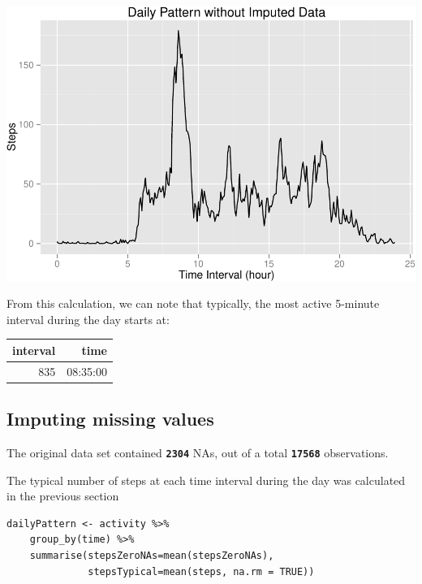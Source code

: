 \documentclass[]{article}
\newenvironment{Shaded}{\begin{snugshade}}{\end{snugshade}}
\newcommand{\KeywordTok}[1]{\textcolor[rgb]{0.13,0.29,0.53}{\textbf{{#1}}}}
\newcommand{\StringTok}[1]{\textcolor[rgb]{0.31,0.60,0.02}{{#1}}}
\newcommand{\CommentTok}[1]{\textcolor[rgb]{0.56,0.35,0.01}{\textit{{#1}}}}
\newcommand{\NormalTok}[1]{{#1}}
\begin{document}
\includegraphics{PA1_template_files/figure-latex/unnamed-chunk-2-1.pdf}

From this calculation, we can note that typically, the most active
5-minute interval during the day starts at:

\begin{Shaded}
\end{Shaded}

\begin{longtable}[c]{@{}rr@{}}
\toprule
interval & time\tabularnewline
\midrule
\endhead
835 & 08:35:00\tabularnewline
\bottomrule
\end{longtable}

\subsection{Imputing missing values}\label{imputing-missing-values}

The original data set contained \textbf{\texttt{2304}} NAs, out of a
total \textbf{\texttt{17568}} observations.

The typical number of steps at each time interval during the day was
calculated in the previous section

\begin{verbatim}
dailyPattern <- activity %>%
    group_by(time) %>% 
    summarise(stepsZeroNAs=mean(stepsZeroNAs), 
              stepsTypical=mean(steps, na.rm = TRUE))
\end{verbatim}
\end{document}
